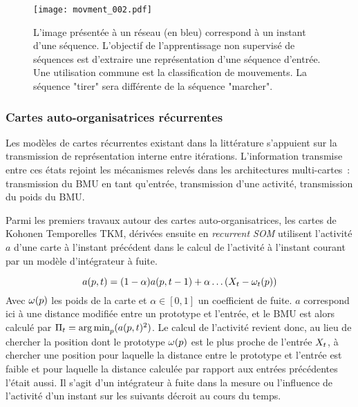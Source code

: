 \documentclass[../main]{subfiles}
\begin{document}
\begin{figure}
    \centering\texttt{[image: movment\_002.pdf]}
    \caption{L'image présentée à un réseau (en bleu) correspond à un instant d'une séquence. L'objectif de l'apprentissage non supervisé de séquences est d'extraire une représentation d'une séquence d'entrée. Une utilisation commune est la classification de mouvements. La séquence "tirer" sera différente de la séquence "marcher".\label{fig:mouvement}}
 \end{figure}


\subsubsection{Cartes auto-organisatrices récurrentes}

Les modèles de cartes récurrentes existant dans la littérature s'appuient sur la transmission de représentation interne entre itérations. 
L'information transmise entre ces états rejoint les mécanismes relevés dans les architectures multi-cartes~: transmission du BMU en tant qu'entrée, transmission d'une activité, transmission du poids du BMU.

Parmi les premiers travaux autour des cartes auto-organisatrices, les cartes de Kohonen Temporelles TKM, dérivées ensuite en \emph{recurrent SOM} \cite{varsta_temporal_2001} utilisent l'activité $a$ d'une carte à l'instant précédent dans le calcul de l'activité à l'instant courant par un modèle d'intégrateur à fuite.

$$a(p,t) = (1-\alpha)a(p,t-1) + \alpha \dots (X_t - \omega_t(p))$$
Avec $\omega(p)$ les poids de la carte et $\alpha \in [0,1]$ un coefficient de fuite.
$a$ correspond ici à une distance modifiée entre un prototype et l'entrée, et le BMU est alors calculé par $\Pi_t = \operatorname*{arg\,min}_p(a(p,t)^2)$.
Le calcul de l'activité revient donc, au lieu de chercher la position dont le prototype $\omega(p)$ est le plus proche de l'entrée $X_t$, à chercher une position pour laquelle la distance entre le prototype et l'entrée est faible et pour laquelle la distance calculée par rapport aux entrées précédentes l'était aussi. Il s'agit d'un intégrateur à fuite dans la mesure ou l'influence de l'activité d'un instant sur les suivants décroit au cours du temps.
\end{document}
